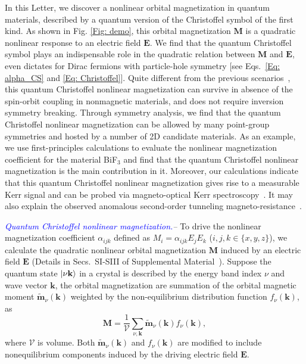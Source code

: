 \documentclass[aps,prl,twocolumn,amsmath,amssymb,showpacs, superscriptaddress,notitlepage,longbibliography,10pt]{revtex4-1}
\begin{document}
In this Letter, we discover a nonlinear orbital magnetization in quantum materials, described by a quantum version of the Christoffel symbol of the first kind.  As shown in Fig. \ref{Fig: demo}, this orbital magnetization $\mathbf{M}$ is a quadratic nonlinear response to an electric field $\mathbf{E}$. We find that the quantum Christoffel symbol plays an indispensable role in the quadratic relation between $\mathbf{M}$ and $\mathbf{E}$, even dictates for Dirac fermions with particle-hole symmetry [see Eqs.~\eqref{Eq: alpha_CS} and \eqref{Eq: Christoffel}].
Quite different from the previous scenarios~\cite{Yoda15sr,Moore16prl,Pesin17prb,Murakami20prb,Edestein90ssc,Kato04prl,Manchon19rmp,YangSY22prl,YangSY23prl}, this quantum Christoffel nonlinear magnetization can survive in absence of the spin-orbit coupling in nonmagnetic materials, and does not require inversion symmetry breaking. Through symmetry analysis, we find that the quantum Christoffel nonlinear magnetization can be allowed by many point-group symmetries and hosted by a number of 2D candidate materials. As an example, we use first-principles calculations to evaluate the nonlinear magnetization coefficient for the material BiF$_3$ and find that the quantum Christoffel nonlinear magnetization is the main contribution in it. Moreover, our calculations indicate that this quantum Christoffel nonlinear magnetization gives rise to a measurable Kerr signal and can be probed via magneto-optical Kerr spectroscopy~\cite{Sugano13book,Kuch15book}. It may also explain the observed anomalous second-order tunneling magneto-resistance~\cite{LiaoZM24prb}.


\textit{\textcolor{blue}{Quantum Christoffel nonlinear magnetization.}--} To drive the nonlinear magnetization coefficient $\alpha_{ijk}$ defined as $M_i=\alpha_{ijk}E_j E_k$ ($i,j,k\in \{x,y,z\}$), we calculate the quadratic nonlinear orbital magnetization $\mathbf{M}$ induced by an electric field $\mathbf{E}$ (Details in Secs.~SI-SIII of Supplemental Material~\cite{Supp}). Suppose the quantum state $\ket{\nu\mathbf k}$ in a crystal is described
by the energy band index $\nu $ and wave vector $\mathbf{k}$, the orbital magnetization are summation of the orbital magnetic moment $\tilde{\mathbf{m}}_\nu(\mathbf{k})$ weighted by the non-equilibrium distribution function $f_\nu(\mathbf{k})$, as
\begin{equation}\label{Eq: M_def}
\mathbf{M}=\frac{1}{\mathcal{V}}\sum_{\nu,\mathbf{k}}\tilde{\mathbf{m}}_\nu(\mathbf{k}) f_\nu(\mathbf{k}),
\end{equation}
where $\mathcal{V}$ is volume. Both $\tilde{\mathbf{m}}_\nu(\mathbf{k})$ and  $f_\nu(\mathbf{k})$ are modified to include nonequilibrium components induced by the driving electric field $\mathbf{E}$.
\end{document}
